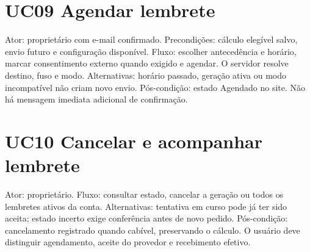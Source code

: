 \section{UC09 Agendar lembrete}
\label{section-A-9}
Ator: proprietário com e-mail confirmado. Precondições: cálculo elegível salvo, envio futuro e configuração disponível. Fluxo: escolher antecedência e horário, marcar consentimento externo quando exigido e agendar. O servidor resolve destino, fuso e modo. Alternativas: horário passado, geração ativa ou modo incompatível não criam novo envio. Pós-condição: estado Agendado no site. Não há mensagem imediata adicional de confirmação.

\section{UC10 Cancelar e acompanhar lembrete}
\label{section-A-10}
Ator: proprietário. Fluxo: consultar estado, cancelar a geração ou todos os lembretes ativos da conta. Alternativas: tentativa em curso pode já ter sido aceita; estado incerto exige conferência antes de novo pedido. Pós-condição: cancelamento registrado quando cabível, preservando o cálculo. O usuário deve distinguir agendamento, aceite do provedor e recebimento efetivo.
